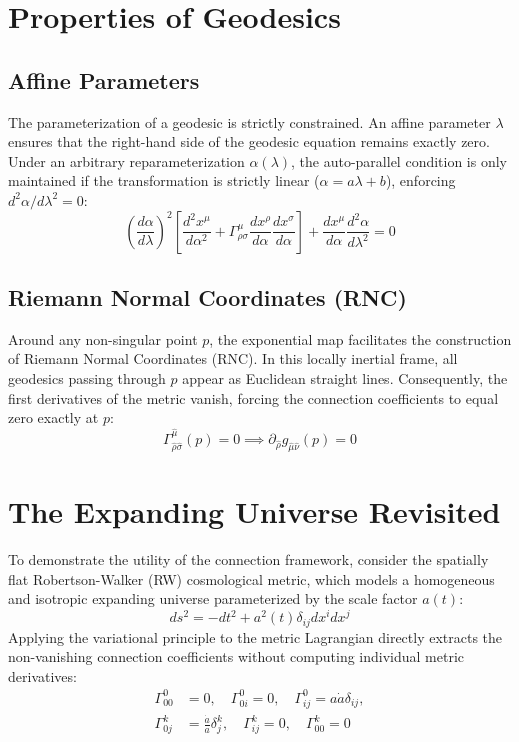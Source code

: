 \documentclass[11pt, a4paper]{report}
\begin{document}
\section{Properties of Geodesics}

\subsection*{Affine Parameters}
The parameterization of a geodesic is strictly constrained. An affine parameter $\lambda$ ensures that the right-hand side of the geodesic equation remains exactly zero. Under an arbitrary reparameterization $\alpha(\lambda)$, the auto-parallel condition is only maintained if the transformation is strictly linear ($\alpha = a\lambda + b$), enforcing $d^2\alpha/d\lambda^2 = 0$:
\begin{equation}
\left( \frac{d\alpha}{d\lambda} \right)^2 \left[ \frac{d^2 x^\mu}{d\alpha^2} + \Gamma^\mu_{\rho\sigma} \frac{dx^\rho}{d\alpha} \frac{dx^\sigma}{d\alpha} \right] + \frac{dx^\mu}{d\alpha} \frac{d^2\alpha}{d\lambda^2} = 0
\end{equation}

\subsection*{Riemann Normal Coordinates (RNC)}
Around any non-singular point $p$, the exponential map facilitates the construction of Riemann Normal Coordinates (RNC). In this locally inertial frame, all geodesics passing through $p$ appear as Euclidean straight lines. Consequently, the first derivatives of the metric vanish, forcing the connection coefficients to equal zero exactly at $p$:
\begin{equation}
\Gamma^{\hat{\mu}}_{\hat{\rho}\hat{\sigma}}(p) = 0 \implies \partial_{\hat{\rho}} g_{\hat{\mu}\hat{\nu}}(p) = 0
\end{equation}

\section{The Expanding Universe Revisited}
To demonstrate the utility of the connection framework, consider the spatially flat Robertson-Walker (RW) cosmological metric, which models a homogeneous and isotropic expanding universe parameterized by the scale factor $a(t)$:
\begin{equation}
ds^2 = -dt^2 + a^2(t) \delta_{ij} dx^i dx^j
\end{equation}
Applying the variational principle to the metric Lagrangian directly extracts the non-vanishing connection coefficients without computing individual metric derivatives:
\begin{align}
\Gamma^0_{00} &= 0, \quad \Gamma^0_{0i} = 0, \quad \Gamma^0_{ij} = a\dot{a} \delta_{ij}, \\
\Gamma^k_{0j} &= \frac{\dot{a}}{a} \delta^k_j, \quad \Gamma^k_{ij} = 0, \quad \Gamma^k_{00} = 0
\end{align}
\end{document}
